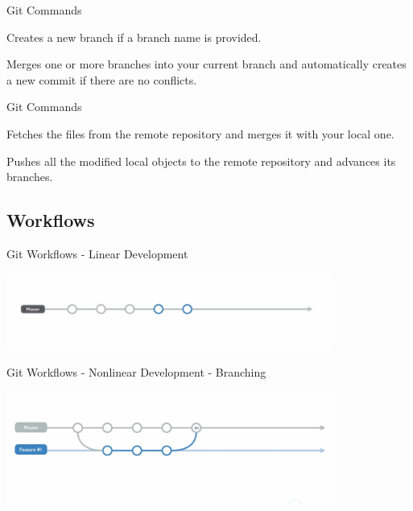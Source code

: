 \documentclass[xcolor=dvipsnames]{beamer}
\begin{document}
\begin{frame}{Git Commands}

\begin{tcolorbox}[title=git branch]
Creates a new branch if a branch name is provided.
\end{tcolorbox}

\begin{tcolorbox}[title=git merge]
Merges one or more branches into your current branch and automatically creates a new commit if there are no conflicts.
\end{tcolorbox}

\end{frame}

\begin{frame}{Git Commands}

\begin{tcolorbox}[title=git pull]
Fetches the files from the remote repository and merges it with your local one.
\end{tcolorbox}

\begin{tcolorbox}[title=git push]
Pushes all the modified local objects to the remote repository and advances its branches.
\end{tcolorbox}

\end{frame}

\subsection{Workflows}

\begin{frame}{Git Workflows - Linear Development}

\includegraphics[width = 0.8\textwidth]{linearDevelopment.png}

\end{frame}

\begin{frame}{Git Workflows - Nonlinear Development - Branching}

\includegraphics[width = 0.8\textwidth]{nonlinearDevelopment.png}

\end{frame}
\end{document}
